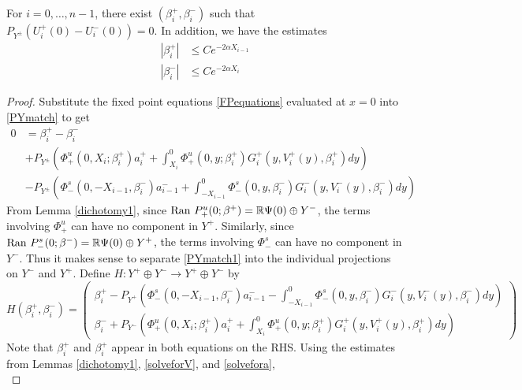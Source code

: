 \documentclass[thesis.tex]{subfiles}
\begin{document}
\begin{lemma}\label{solveforbeta}
For $i = 0, \dots, n-1$, there exist $(\beta_i^+, \beta_i^-)$ such that $P_{Y^\pm}(U_i^+(0) - U_i^-(0)) = 0$. In addition, we have the estimates
\begin{equation}\label{betaest}
\begin{aligned}
|\beta_i^+| &\leq C e^{-2 \alpha X_{i-1}} \\
|\beta_i^-| &\leq C e^{-2 \alpha X_i}
\end{aligned}
\end{equation}
\begin{proof}
Substitute the fixed point equations \eqref{FPequations} evaluated at $x = 0$ into \eqref{PYmatch} to get
\begin{equation}\label{PYmatch1}
\begin{aligned}
0 &= \beta_i^+ - \beta_i^- \\
&+ P_{Y^\pm} \left( \Phi^u_+(0, X_i; \beta_i^+) a_i^+ 
+ \int_{X_i}^0 \Phi_+^u(0, y; \beta_i^+) G_i^+(y, V_i^+(y),\beta_i^+)dy \right) \\
&- P_{Y^\pm} \left( \Phi^s_-(0, -X_{i-1}, \beta_i^-) a_{i-1}^- 
+ \int_{-X_{i-1}}^0 \Phi_-^s(0, y, \beta_i^-) G_i^-(y, V_i^-(y),\beta_i^-) dy \right) 
\end{aligned}
\end{equation}
From Lemma \ref{dichotomy1}, since $\text{Ran }P_+^u(0; \beta^+) = \mathbb{R} \Psi(0) \oplus Y^-$, the terms involving $\Phi^u_+$ can have no component in $Y^+$. Similarly, since $\text{Ran }P_-^s(0; \beta^-) = \mathbb{R} \Psi(0) \oplus Y^+$, the terms involving $\Phi^s_-$ can have no component in $Y^-$. Thus it makes sense to separate \eqref{PYmatch1} into the individual projections on $Y^-$ and $Y^+$. Define $H: Y^+ \oplus Y^- \rightarrow Y^+ \oplus Y^-$ by
\begin{equation}\label{defHPY}
H(\beta_i^+, \beta_i^-) = 
\begin{pmatrix}
\beta_i^+ - P_{Y^+}\left(\Phi^s_-(0, -X_{i-1}, \beta_i^-) a_{i-1}^- 
- \int_{-X_{i-1}}^0 \Phi_-^s(0, y, \beta_i^-) G_i^-(y, V_i^-(y),\beta_i^-) dy\right) \\
\beta_i^- + P_{Y^-}\left( \Phi^u_+(0, X_i; \beta_i^+) a_i^+ 
+ \int_{X_i}^0 \Phi_+^u(0, y; \beta_i^+) G_i^+(y, V_i^+(y),\beta_i^+)dy \right)
\end{pmatrix}
\end{equation}
Note that $\beta_i^+$ and $\beta_i^+$ appear in both equations on the RHS. Using the estimates from Lemmas \ref{dichotomy1}, \ref{solveforV}, and \ref{solvefora},
\begin{equation}\label{H0bound}

\end{equation}
\end{proof}
\end{lemma}
\end{document}
